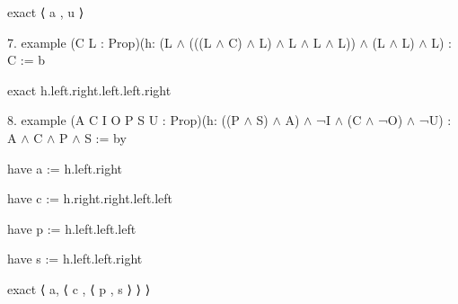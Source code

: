 \documentclass{article}
\theoremstyle{theorem}
\theoremstyle{definition}
\theoremstyle{remark}
\begin{document}
\begin{list}{}{A Lean Intro to Logic:}
  \hspace{6cm}exact ⟨ a , u ⟩ 
  
  \item {7.} example (C L : Prop)(h: (L $\wedge$ (((L $\wedge$ C) $\wedge$ L) $\wedge$ L $\wedge$ L $\wedge$ L)) $\wedge$ (L $\wedge$ L) $\wedge$ L) : C := b
  
  \hspace{6cm}exact h.left.right.left.left.right
  
  \item {8.} example (A C I O P S U : Prop)(h: ((P $\wedge$ S) $\wedge$ A) $\wedge$ ¬I $\wedge$ (C $\wedge$ ¬O) $\wedge$ ¬U) : A $\wedge$ C $\wedge$ P $\wedge$ S := by

    \hspace{6cm}have a := h.left.right

    \hspace{6cm}have c := h.right.right.left.left

    \hspace{6cm}have p := h.left.left.left

    \hspace{6cm}have s := h.left.left.right

    \hspace{6cm}exact ⟨ a, ⟨ c , ⟨ p , s ⟩ ⟩ ⟩


\end{list}
\end{document}
